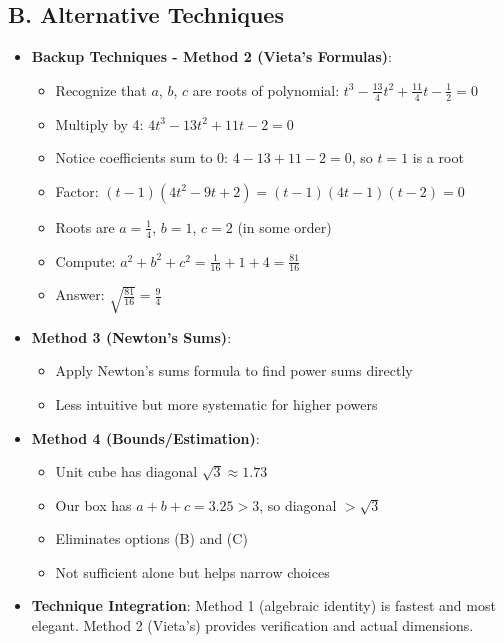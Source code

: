 \documentclass[12pt]{article}
\begin{document}
\begin{techniquesbox}
\subsection*{B. Alternative Techniques}
\begin{itemize}[leftmargin=*]
    \item \textbf{Backup Techniques - Method 2 (Vieta's Formulas)}: 
    \begin{itemize}
        \item Recognize that $a$, $b$, $c$ are roots of polynomial: $t^3 - \frac{13}{4}t^2 + \frac{11}{4}t - \frac{1}{2} = 0$
        \item Multiply by 4: $4t^3 - 13t^2 + 11t - 2 = 0$
        \item Notice coefficients sum to 0: $4-13+11-2=0$, so $t=1$ is a root
        \item Factor: $(t-1)(4t^2-9t+2) = (t-1)(4t-1)(t-2) = 0$
        \item Roots are $a=\frac{1}{4}$, $b=1$, $c=2$ (in some order)
        \item Compute: $a^2+b^2+c^2 = \frac{1}{16} + 1 + 4 = \frac{81}{16}$
        \item Answer: $\sqrt{\frac{81}{16}} = \frac{9}{4}$
    \end{itemize}
    \item \textbf{Method 3 (Newton's Sums)}: 
    \begin{itemize}
        \item Apply Newton's sums formula to find power sums directly
        \item Less intuitive but more systematic for higher powers
    \end{itemize}
    \item \textbf{Method 4 (Bounds/Estimation)}: 
    \begin{itemize}
        \item Unit cube has diagonal $\sqrt{3} \approx 1.73$
        \item Our box has $a+b+c = 3.25 > 3$, so diagonal $> \sqrt{3}$
        \item Eliminates options (B) and (C)
        \item Not sufficient alone but helps narrow choices
    \end{itemize}
    \item \textbf{Technique Integration}: Method 1 (algebraic identity) is fastest and most elegant. Method 2 (Vieta's) provides verification and actual dimensions.
\end{itemize}
\end{techniquesbox}
\end{document}
